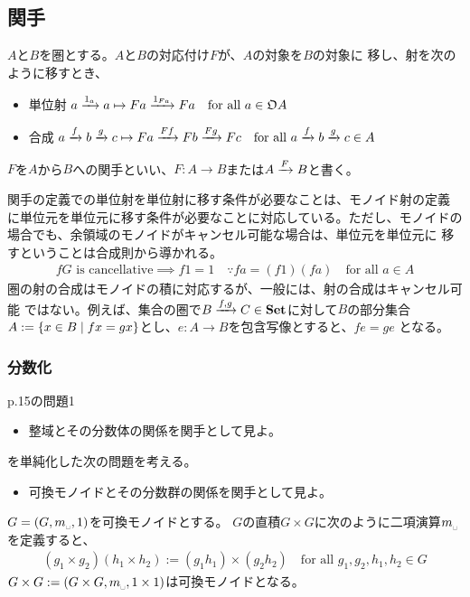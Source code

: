 {\subsection{関手}\label{s2:関手} %
	\begin{definition}[関手]\label{def:関手} %
		$A$と$B$を圏とする。$A$と$B$の対応付け$F$が、$A$の対象を$B$の対象に
		移し、射を次のように移すとき、
		\begin{itemize}\setlength{\itemsep}{-1mm} %
			\item 単位射 \quad$a\xrightarrow[{}]{1_a}a\mapsto Fa\xrightarrow[{}]{1_{Fa}}Fa
			\quad\text{for all } a\in{\mathfrak{O}} A$
			\item 合成 \quad $a\xrightarrow[{}]{f}b\xrightarrow[{}]{g}c\mapsto Fa\xrightarrow[{}]{Ff}Fb\xrightarrow[{}]{Fg}Fc
			\quad\text{for all } a\xrightarrow[{}]{f}b\xrightarrow[{}]{g}c\in A$
		\end{itemize} %
		$F$を$A$から$B$への関手といい、$F:A\to B$または$A\xrightarrow[{}]{F}B$と書く。
	\end{definition} %

	関手の定義での単位射を単位射に移す条件が必要なことは、モノイド射の定義
	に単位元を単位元に移す条件が必要なことに対応している。ただし、モノイドの
	場合でも、余領域のモノイドがキャンセル可能な場合は、単位元を単位元に
	移すということは合成則から導かれる。
	\begin{equation*}\begin{split}
		fG\text{ is cancellative} \implies f1 = 1
		\quad\because fa = (f1)(fa) \quad\text{for all } a\in A
	\end{split}\end{equation*}
	圏の射の合成はモノイドの積に対応するが、一般には、射の合成はキャンセル可能
	ではない。例えば、集合の圏で$B\xrightarrow[{}]{f,g}C\in{\mathbf{Set}}$に対して$B$の部分集合
	$A:=\mathinner{\{{x\in B\mid fx=gx}\}}$とし、$e:A\to B$を包含写像とすると、$fe=ge$
	となる。
\subsubsection{分数化}\label{s3:分数化} %
	\cite{maclane.work}p.15の問題1
	\begin{itemize}\setlength{\itemsep}{-1mm} %
		\item 整域とその分数体の関係を関手として見よ。
	\end{itemize} %
	を単純化した次の問題を考える。
	\begin{itemize}\setlength{\itemsep}{-1mm} %
		\item 可換モノイドとその分数群の関係を関手として見よ。
	\end{itemize} %

	$G=(G,m_\myspace,1)$を可換モノイドとする。
	$G$の直積$G\times G$に次のように二項演算$m_\myspace$を定義すると、
	\begin{equation*}\begin{split}
		(g_1\times g_2)(h_1\times h_2) := (g_1h_1)\times(g_2h_2)
		\quad\text{for all } g_1,g_2,h_1,h_2\in G
	\end{split}\end{equation*}
	$G\times G:=(G\times G,m_\myspace,1\times 1)$は可換モノイドとなる。
	
}
